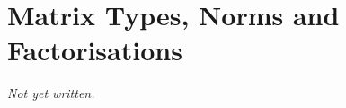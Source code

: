 \chapter{Matrix Types, Norms and Factorisations}\label{ch:matrix-factorisations}


\textit{Not yet written.}
